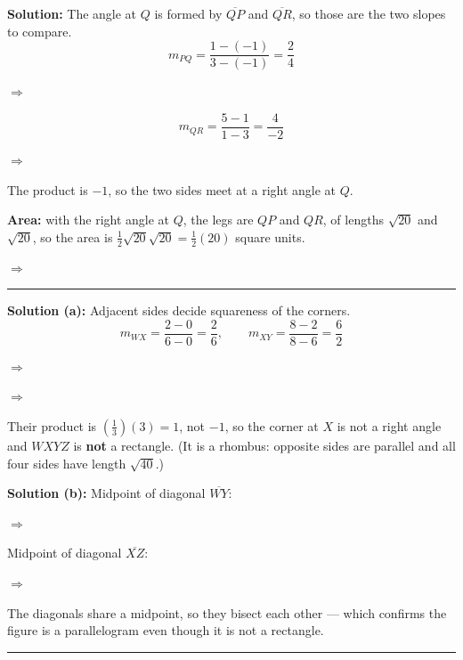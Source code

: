 \documentclass[12pt]{article}
\begin{document}

\textbf{Solution:} The angle at $Q$ is formed by $\overline{QP}$ and $\overline{QR}$, so those are the two slopes to compare.
\[ m_{PQ} = \frac{1 - (-1)}{3 - (-1)} = \frac{2}{4} \]

$\Rightarrow$ 

\[ m_{QR} = \frac{5 - 1}{1 - 3} = \frac{4}{-2} \]

$\Rightarrow$ 

The product is $-1$, so the two sides meet at a right angle at $Q$.

\textbf{Area:} with the right angle at $Q$, the legs are $QP$ and $QR$, of lengths $\sqrt{20}$ and $\sqrt{20}$, so the area is $\tfrac{1}{2}\sqrt{20}\sqrt{20} = \tfrac{1}{2}(20)$ square units.

$\Rightarrow$ 

\vspace{0.15cm}\noindent\rule{\linewidth}{0.2pt}


\textbf{Solution (a):} Adjacent sides decide squareness of the corners.
\[ m_{WX} = \frac{2 - 0}{6 - 0} = \frac{2}{6}, \qquad m_{XY} = \frac{8 - 2}{8 - 6} = \frac{6}{2} \]

$\Rightarrow$ 

$\Rightarrow$ 

Their product is $\left(\tfrac{1}{3}\right)(3) = 1$, not $-1$, so the corner at $X$ is not a right angle and $WXYZ$ is \textbf{not} a rectangle. (It is a rhombus: opposite sides are parallel and all four sides have length $\sqrt{40}$.)

\textbf{Solution (b):} Midpoint of diagonal $\overline{WY}$:

$\Rightarrow$ 

Midpoint of diagonal $\overline{XZ}$:

$\Rightarrow$ 

The diagonals share a midpoint, so they bisect each other --- which confirms the figure is a parallelogram even though it is not a rectangle.

\vspace{0.15cm}\noindent\rule{\linewidth}{0.2pt}

\end{document}
